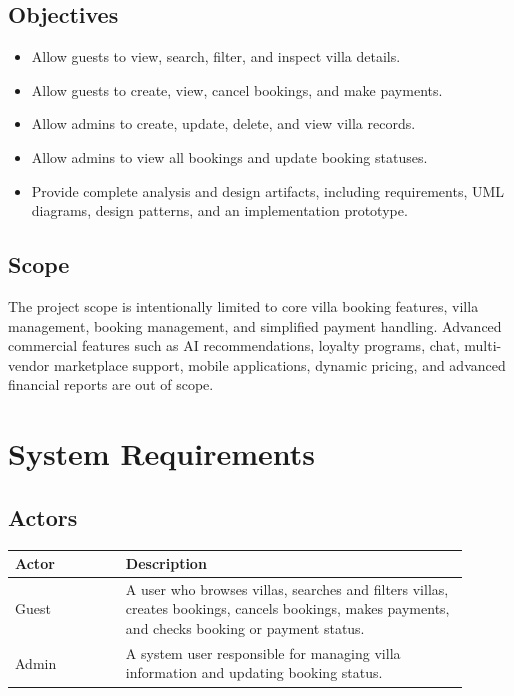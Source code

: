 \documentclass[12pt,a4paper]{article}
\begin{document}
\subsection{Objectives}

\begin{itemize}[noitemsep]
  \item Allow guests to view, search, filter, and inspect villa details.
  \item Allow guests to create, view, cancel bookings, and make payments.
  \item Allow admins to create, update, delete, and view villa records.
  \item Allow admins to view all bookings and update booking statuses.
  \item Provide complete analysis and design artifacts, including requirements, UML diagrams, design patterns, and an implementation prototype.
\end{itemize}

\subsection{Scope}

The project scope is intentionally limited to core villa booking features, villa management, booking management, and simplified payment handling. Advanced commercial features such as AI recommendations, loyalty programs, chat, multi-vendor marketplace support, mobile applications, dynamic pricing, and advanced financial reports are out of scope.

\section{System Requirements}

\subsection{Actors}

\begin{longtable}{|L{0.22\linewidth}|L{0.68\linewidth}|}
\hline
\textbf{Actor} & \textbf{Description} \\
\hline
Guest & A user who browses villas, searches and filters villas, creates bookings, cancels bookings, makes payments, and checks booking or payment status. \\
\hline
Admin & A system user responsible for managing villa information and updating booking status. \\
\hline
\end{longtable}
\end{document}
